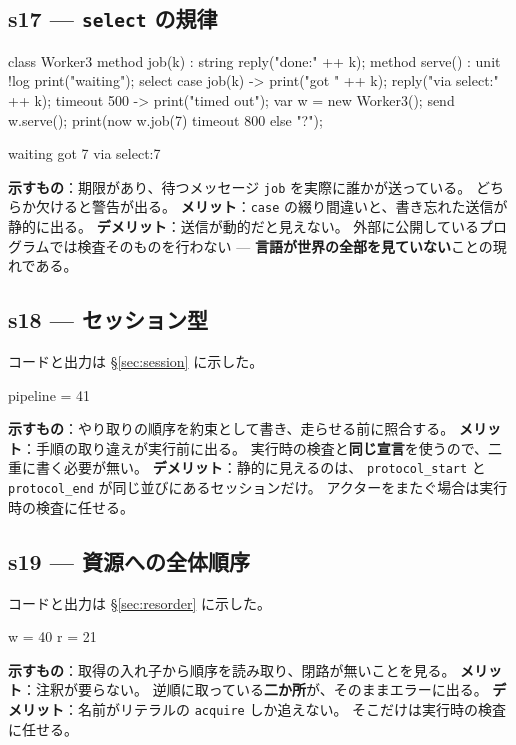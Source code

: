 \documentclass[11pt,a4paper]{ltjsarticle}
\theoremstyle{definition}
\theoremstyle{remark}
\begin{document}
\subsection{s17 --- \texttt{select} の規律}
\begin{aipl}
class Worker3 {
  method job(k) : string { reply("done:" ++ k); }
  method serve() : unit !{log} {
    print("waiting");
    select {
      case job(k) -> { print("got " ++ k); reply("via select:" ++ k); }
      timeout 500 -> { print("timed out"); }
    }
  }
}
var w = new Worker3();
send w.serve();
print(now w.job(7) timeout 800 else "?");
\end{aipl}
\begin{term}
waiting
got 7
via select:7
\end{term}
\textbf{示すもの}：期限があり、待つメッセージ \texttt{job} を実際に誰かが送っている。
どちらか欠けると警告が出る。
\textbf{メリット}：\texttt{case} の綴り間違いと、書き忘れた送信が静的に出る。
\textbf{デメリット}：送信が動的だと見えない。
外部に公開しているプログラムでは検査そのものを行わない ---
\textbf{言語が世界の全部を見ていない}ことの現れである。

\subsection{s18 --- セッション型}
コードと出力は \S\ref{sec:session} に示した。
\begin{term}
pipeline = 41
\end{term}
\textbf{示すもの}：やり取りの順序を約束として書き、走らせる前に照合する。
\textbf{メリット}：手順の取り違えが実行前に出る。
実行時の検査と\textbf{同じ宣言}を使うので、二重に書く必要が無い。
\textbf{デメリット}：静的に見えるのは、
\texttt{protocol\_start} と \texttt{protocol\_end} が同じ並びにあるセッションだけ。
アクターをまたぐ場合は実行時の検査に任せる。

\subsection{s19 --- 資源への全体順序}
コードと出力は \S\ref{sec:resorder} に示した。
\begin{term}
w = 40
r = 21
\end{term}
\textbf{示すもの}：取得の入れ子から順序を読み取り、閉路が無いことを見る。
\textbf{メリット}：注釈が要らない。
逆順に取っている\textbf{二か所}が、そのままエラーに出る。
\textbf{デメリット}：名前がリテラルの \texttt{acquire} しか追えない。
そこだけは実行時の検査に任せる。
\end{document}
